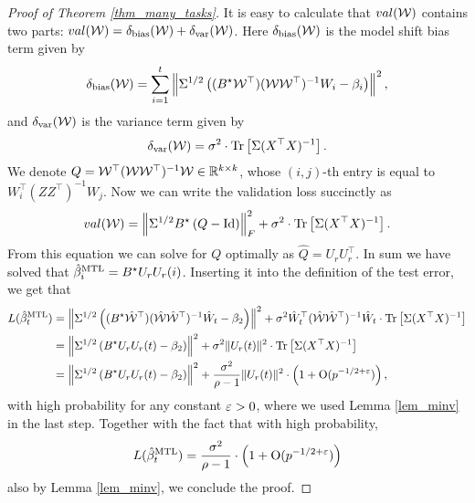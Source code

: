 \begin{proof}[Proof of Theorem \ref{thm_many_tasks}]
	It is easy to calculate that $val( \mathcal W)$ contains two parts: $val( \mathcal W)= \delta_{\text{bias}}(\mathcal W) + \delta_{\text{var}}(\mathcal W)$. Here $\delta_{\text{bias}}(\mathcal W) $ is the model shift bias term given by
	\begin{align*}
		\delta_{\text{bias}}(\mathcal W) =\sum_{i=1}^t  \left\| \Sigma^{1/2}\left({(B^\star \mathcal W^\top) (\mathcal W\mathcal W^{\top})^{-1} W_i - \beta_i}\right) \right\|^2,
	\end{align*}
	and $\delta_{\text{var}}(\mathcal W)$ is the variance term given by
	\begin{align*}
		\delta_{\text{var}}(\mathcal W)= \sigma^2 \cdot \operatorname{Tr}\left[\Sigma (X^{\top}X)^{-1}\right].
	\end{align*}
	We denote $Q = \mathcal W^{\top} (\mathcal W\mathcal W^{\top})^{-1} \mathcal W \in\mathbb{R}^{k\times k}$, whose $(i,j)$-th entry is equal to $W_i^{\top} (ZZ^{\top})^{-1} W_j$.
	Now we can write the validation loss succinctly as 
	\begin{align*}
		val(\mathcal W) = \left\| \Sigma^{1/2}B^{\star}  \left({Q -\operatorname{Id}}\right) \right\|_{F}^2 + \sigma^2 \cdot \operatorname{Tr}\left[\Sigma (X^{\top}X)^{-1}\right].
	\end{align*}
	From this equation we can solve for $Q$ optimally as $\hat Q=U_{r}U_r^{\top}$.
	In sum we have solved that $\hat{\beta}_i^{\text{MTL}}=B^{\star} U_r U_r(i)$. Inserting it into the definition of the test error, we get that
	\begin{align*}
		L(\hat{\beta}_t^{\text{MTL}}) &= \left\| \Sigma^{1/2} \left((B^\star \hat{\mathcal W}^\top) (\hat{\mathcal W}\hat{\mathcal W}^{\top})^{-1} \hat W_t - \beta_2 \right)  \right\|^2
		+ \sigma^2  \hat W_t^{\top} (\hat{\mathcal W}\hat{\mathcal W}^{\top})^{-1} \hat W_t \cdot \operatorname{Tr}\left[\Sigma (X^{\top}X)^{-1}\right] \\
		&= \left\| \Sigma^{1/2} \left({B^{\star} U_r U_r(t)-\beta_2}\right) \right\|^2 + \sigma^2\|U_r(t)\|^2 \cdot \operatorname{Tr}\left[\Sigma (X^{\top}X)^{-1}\right] \\
		&= \left\| \Sigma^{1/2} \left({B^{\star} U_r U_r(t)-\beta_2}\right) \right\|^2 + \frac{\sigma^2}{\rho-1}\|U_r(t)\|^2 \cdot \left( 1+\operatorname{O}(p^{-1/2+{\varepsilon}})\right),
	\end{align*}
	with high probability for any constant ${\varepsilon}>0$, where we used Lemma \ref{lem_minv} in the last step. Together with the fact that with high probability,
	$$L(\hat{\beta}_t^{\text{MTL}})=\frac{\sigma^2}{\rho-1} \cdot \left( 1+\operatorname{O}(p^{-1/2+{\varepsilon}})\right)$$
	 also by Lemma \ref{lem_minv}, we conclude the proof.
\end{proof}
